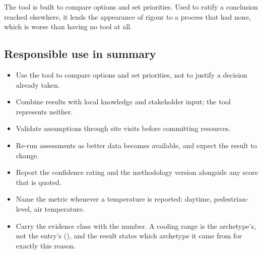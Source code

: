The tool is built to compare options and set priorities. Used to ratify a
conclusion reached elsewhere, it lends the appearance of rigour to a process
that had none, which is worse than having no tool at all.

\subsection{Responsible use in summary}

\begin{itemize}
  \item Use the tool to compare options and set priorities, not to justify a
  decision already taken.
  \item Combine results with local knowledge and stakeholder input; the tool
  represents neither.
  \item Validate assumptions through site visits before committing resources.
  \item Re-run assessments as better data becomes available, and expect the
  result to change.
  \item Report the confidence rating and the methodology version alongside any
  score that is quoted.
  \item Name the metric whenever a temperature is reported: daytime,
  pedestrian-level, air temperature.
  \item Carry the evidence class with the number. A cooling range is the
  archetype's, not the entry's (), and the result
  states which archetype it came from for exactly this reason.
\end{itemize}
